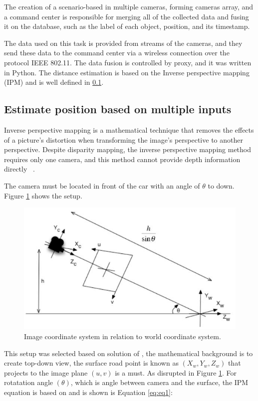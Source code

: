  The creation of a scenario-based in multiple cameras, forming cameras array, and a command center is responsible for merging all of the collected data and fusing it on the database, such as the label of each object, position, and its timestamp. 

The data used on this task is provided from streams of the cameras, and they send these data to the command center via a wireless connection over the protocol IEEE 802.11. The data fusion is controlled by proxy, and it was written in Python. The distance estimation is based on the Inverse perspective mapping (IPM) and is well defined in \ref{ipm}.


\subsection{Estimate position based on multiple inputs}\label{ipm}
Inverse perspective mapping is a mathematical technique that removes the effects of a picture's distortion when transforming the image's perspective to another perspective. Despite disparity mapping, the inverse perspective mapping method requires only one camera, and this method cannot provide depth information directly ~\cite{Tuohy2010}.

The camera must be located in front of the car with an angle of \(\theta\) to down. Figure \ref{fig:ImageRelationSystem} shows the setup.

\begin{figure}[h]
\centering
\includegraphics[scale=0.5]{imagens/Inverse Perspective Mapping.JPG}
\caption{Image coordinate system in relation to world coordinate
system.}
\label{fig:ImageRelationSystem}
\end{figure}
\par


This setup was selected based on solution of \cite{Wongsaree2018}, the mathematical background is to create top-down view, the surface road point is known as $(X_w,Y_w,Z_w)$
that projects to the image plane $(u,v)$ is a must. As disrupted in Figure \ref{fig:ImageRelationSystem}. For rotatation angle $(\theta)$, which is angle between camera and the surface, the IPM equation is based on \cite{7759904} and is shown is Equation \ref{eq:eq1}:

